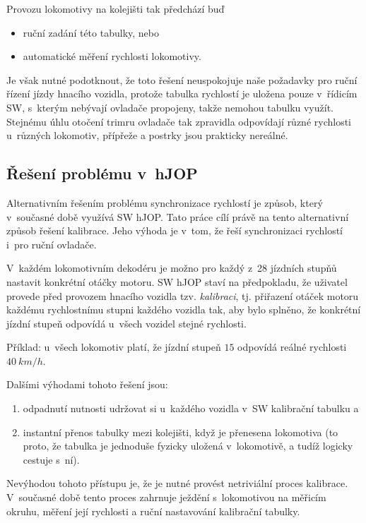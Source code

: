 Provozu lokomotivy na kolejišti tak předchází buď

\begin{itemize}
	\item ruční zadání této tabulky, nebo
	\item automatické měření rychlosti lokomotivy.
\end{itemize}

Je však nutné podotknout, že toto řešení neuspokojuje naše požadavky pro
ruční řízení jízdy hnacího vozidla, protože tabulka rychlostí je uložena
pouze v~řídicím SW, s~kterým nebývají ovladače propojeny, takže nemohou tabulku
využít. Stejnému úhlu otočení trimru ovladače tak zpravidla odpovídají různé
rychlosti u~různých lokomotiv, přípřeže a postrky jsou prakticky nereálné.

\subsection{Řešení problému v~hJOP}

Alternativním řešením problému synchronizace rychlostí je způsob, který
v~současné době využívá SW hJOP. Tato práce cílí právě na tento alternativní
způsob řešení kalibrace. Jeho výhoda je v~tom, že řeší synchronizaci
rychlostí i~pro ruční ovladače.

V~každém lokomotivním dekodéru je možno pro každý z~28 jízdních stupňů nastavit
konkrétní otáčky motoru. SW hJOP staví na předpokladu, že uživatel provede před
provozem hnacího vozidla tzv. \textit{kalibraci}, tj. přiřazení otáček motoru
každému rychlostnímu stupni každého vozidla tak, aby bylo splněno, že konkrétní
jízdní stupeň odpovídá u~všech vozidel stejné rychlosti.

Příklad: u~všech lokomotiv platí, že jízdní stupeň $15$ odpovídá reálné
rychlosti $40\ km/h$.

Dalšími výhodami tohoto řešení jsou:

\begin{enumerate}
	\item odpadnutí nutnosti udržovat si u~každého vozidla v~SW kalibrační
	tabulku a
	\item instantní přenos tabulky mezi kolejišti, když je přenesena
	lokomotiva (to proto, že tabulka je jednoduše fyzicky uložená v~lokomotivě,
	a tudíž logicky cestuje s~ní).
\end{enumerate}

Nevýhodou tohoto přístupu je, že je nutné provést netriviální proces kalibrace.
V~současné době tento proces zahrnuje ježdění s~lokomotivou na měřicím okruhu,
měření její rychlosti a ruční nastavování kalibrační tabulky.

